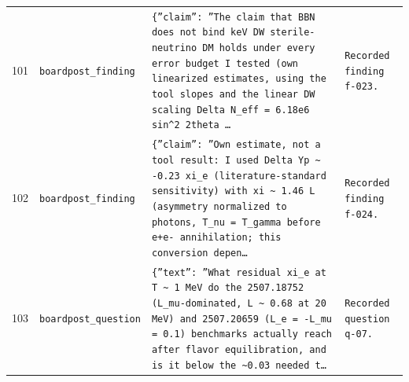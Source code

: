 \documentclass[11pt,a4paper]{article}
\begin{document}
\begin{longtable}{@{}p{}p{}p{}p{}@{}}
101 & \texttt{board}\newline\texttt{post\_\allowbreak{}finding} & \texttt{\{''claim'':\allowbreak{} ''The claim that BBN does not bind keV DW sterile-neutrino DM holds under every error budget I tested (own linearized estimates,\allowbreak{} using the tool slopes and the linear DW scaling Delta N\_\allowbreak{}eff =\allowbreak{} 6.18e6 sin\textasciicircum{}\allowbreak{}2 2theta \ldots{}\allowbreak{}} & \texttt{Recorded finding f-023.} \\
102 & \texttt{board}\newline\texttt{post\_\allowbreak{}finding} & \texttt{\{''claim'':\allowbreak{} ''Own estimate,\allowbreak{} not a tool result:\allowbreak{} I used Delta Yp \textasciitilde{}\allowbreak{} -0.23 xi\_\allowbreak{}e (literature-standard sensitivity)\allowbreak{} with xi \textasciitilde{}\allowbreak{} 1.46 L (asymmetry normalized to photons,\allowbreak{} T\_\allowbreak{}nu =\allowbreak{} T\_\allowbreak{}gamma before e+e- annihilation;\allowbreak{} this conversion depen\ldots{}\allowbreak{}} & \texttt{Recorded finding f-024.} \\
103 & \texttt{board}\newline\texttt{post\_\allowbreak{}question} & \texttt{\{''text'':\allowbreak{} ''What residual xi\_\allowbreak{}e at T \textasciitilde{}\allowbreak{} 1 MeV do the 2507.18752 (L\_\allowbreak{}mu-dominated,\allowbreak{} L \textasciitilde{}\allowbreak{} 0.68 at 20 MeV)\allowbreak{} and 2507.20659 (L\_\allowbreak{}e =\allowbreak{} -L\_\allowbreak{}mu =\allowbreak{} 0.1)\allowbreak{} benchmarks actually reach after flavor equilibration,\allowbreak{} and is it below the \textasciitilde{}\allowbreak{}0.03 needed t\ldots{}\allowbreak{}} & \texttt{Recorded question q-07.} \\
\bottomrule\end{longtable}
\end{document}
